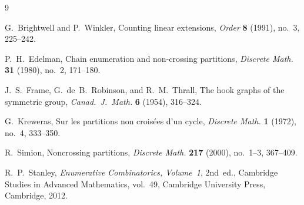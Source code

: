 \documentclass[11pt]{article}
\theoremstyle{definition}
\begin{document}
\begin{thebibliography}{9}

G.~Brightwell and P.~Winkler,
Counting linear extensions,
\emph{Order} \textbf{8} (1991), no.~3, 225--242.

P.~H.~Edelman,
Chain enumeration and non-crossing partitions,
\emph{Discrete Math.} \textbf{31} (1980), no.~2, 171--180.

J.~S.~Frame, G.~de~B.~Robinson, and R.~M.~Thrall,
The hook graphs of the symmetric group,
\emph{Canad.\ J.\ Math.} \textbf{6} (1954), 316--324.

G.~Kreweras,
Sur les partitions non crois\'ees d'un cycle,
\emph{Discrete Math.} \textbf{1} (1972), no.~4, 333--350.

R.~Simion,
Noncrossing partitions,
\emph{Discrete Math.} \textbf{217} (2000), no.~1--3, 367--409.

R.~P.~Stanley,
\emph{Enumerative Combinatorics, Volume~1}, 2nd~ed.,
Cambridge Studies in Advanced Mathematics, vol.~49,
Cambridge University Press, Cambridge, 2012.

\end{thebibliography}
\end{document}
